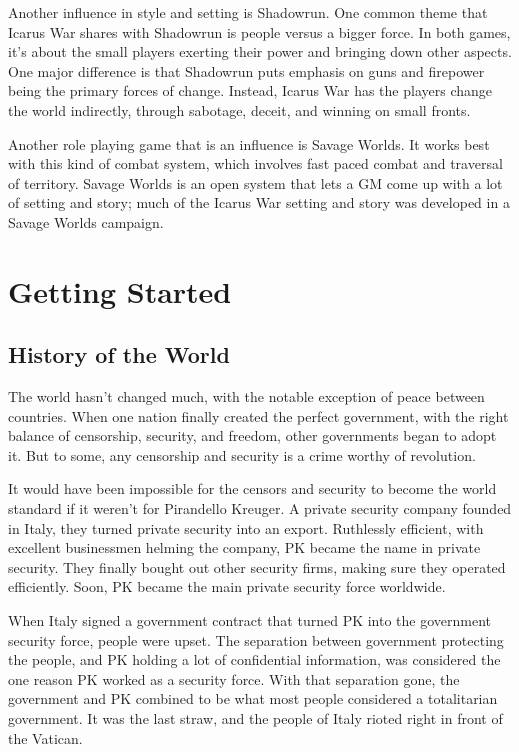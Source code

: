 \documentclass{article}
\begin{document}
\begin{multicols}{2}
Another influence in style and setting is Shadowrun. One common
theme that Icarus War shares with Shadowrun is people versus a bigger force. In
both games, it’s about the small players exerting their power and bringing down
other aspects. One major difference is that Shadowrun puts emphasis on guns and
firepower being the primary forces of change. Instead, Icarus War has the
players change the world indirectly, through sabotage, deceit, and winning on
small fronts.

Another role playing game that is an influence is Savage Worlds.
It works best with this kind of combat system, which involves fast paced combat
and traversal of territory. Savage Worlds is an open system that lets a GM come
up with a lot of setting and story; much of the Icarus War setting and story
was developed in a Savage Worlds campaign.

\section{Getting Started}
\subsection{History of the World}
The world hasn’t changed much, with the notable exception of peace between
countries. When one nation finally created the perfect government, with the
right balance of censorship, security, and freedom, other governments began to
adopt it. But to some, any censorship and security is a crime worthy of
revolution.

It would have been impossible for the censors and security to become the world
standard if it weren’t for Pirandello Kreuger. A private security company
founded in Italy, they turned private security into an export. Ruthlessly
efficient, with excellent businessmen helming the company, PK became the name
in private security. They finally bought out other security firms, making sure
they operated efficiently. Soon, PK became the main private security force
worldwide.

When Italy signed a government contract that turned PK into the government
security force, people were upset. The separation between government protecting
the people, and PK holding a lot of confidential information, was considered
the one reason PK worked as a security force. With that separation gone, the
government and PK combined to be what most people considered a totalitarian
government. It was the last straw, and the people of Italy rioted right in
front of the Vatican.


\end{multicols}
\end{document}

